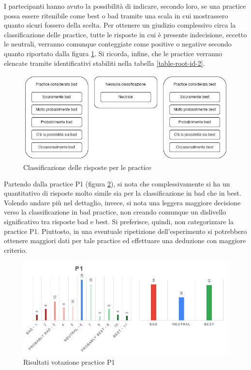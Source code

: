 I partecipanti hanno avuto la possibilità di indicare, secondo loro, se una practice possa essere ritenibile come best o bad tramite una scala in cui mostrassero quanto sicuri fossero della scelta. Per ottenere un giudizio complessivo circa la classificazione delle practice, tutte le risposte in cui è presente indecisione, eccetto le neutrali, verranno comunque conteggiate come positive o negative secondo quanto riportato dalla figura \ref{im-a-prac-1}. Si ricorda, infine, che le practice verranno elencate tramite identificativi stabiliti nella tabella \ref{table-root-id-2}.

\begin{figure}[h!]
    \centering
    \includegraphics[width=400pt]{figure/data-analysis3/labelingbadbest.png}
    \caption{Classificazione delle risposte per le practice}
    \label{im-a-prac-1}
\end{figure}

Partendo dalla practice P1 (figura \ref{im-a-prac-2}), si nota che complessivamente si ha un quantitativo di risposte molto simile sia per la classificazione in bad che in best. Volendo andare più nel dettaglio, invece, si nota una leggera maggiore decisione verso la classificazione in bad practice, non creando comunque un dislivello significativo tra risposte bad e best. Si preferisce, quindi, non categorizzare la practice P1. Piuttosto, in una eventuale ripetizione dell'esperimento si potrebbero ottenere maggiori dati per tale practice ed effettuare una deduzione con maggiore criterio.

\begin{figure}[h!]
    \centering
    \includegraphics[width=1\textwidth]{figure/data-analysis3/P1.png}
    \caption{Risultati votazione practice P1}
    \label{im-a-prac-2}
\end{figure}

